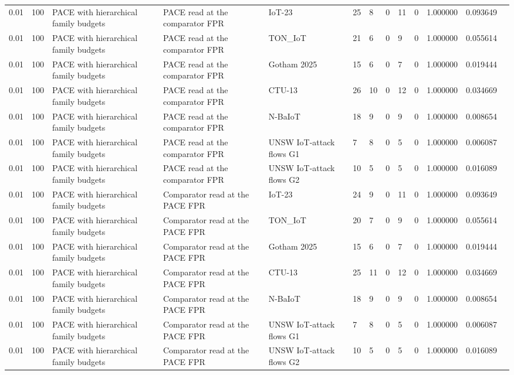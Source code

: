 \begin{tabular}{lllllllllllll}
0.01 & 100 & PACE with hierarchical family budgets & PACE read at the comparator FPR & IoT-23 & 25 & 8 & 0 & 11 & 0 & 1.000000 & 0.093649 &  \\
0.01 & 100 & PACE with hierarchical family budgets & PACE read at the comparator FPR & TON\_IoT & 21 & 6 & 0 & 9 & 0 & 1.000000 & 0.055614 &  \\
0.01 & 100 & PACE with hierarchical family budgets & PACE read at the comparator FPR & Gotham 2025 & 15 & 6 & 0 & 7 & 0 & 1.000000 & 0.019444 &  \\
0.01 & 100 & PACE with hierarchical family budgets & PACE read at the comparator FPR & CTU-13 & 26 & 10 & 0 & 12 & 0 & 1.000000 & 0.034669 &  \\
0.01 & 100 & PACE with hierarchical family budgets & PACE read at the comparator FPR & N-BaIoT & 18 & 9 & 0 & 9 & 0 & 1.000000 & 0.008654 &  \\
0.01 & 100 & PACE with hierarchical family budgets & PACE read at the comparator FPR & UNSW IoT-attack flows G1 & 7 & 8 & 0 & 5 & 0 & 1.000000 & 0.006087 &  \\
0.01 & 100 & PACE with hierarchical family budgets & PACE read at the comparator FPR & UNSW IoT-attack flows G2 & 10 & 5 & 0 & 5 & 0 & 1.000000 & 0.016089 &  \\
0.01 & 100 & PACE with hierarchical family budgets & Comparator read at the PACE FPR & IoT-23 & 24 & 9 & 0 & 11 & 0 & 1.000000 & 0.093649 &  \\
0.01 & 100 & PACE with hierarchical family budgets & Comparator read at the PACE FPR & TON\_IoT & 20 & 7 & 0 & 9 & 0 & 1.000000 & 0.055614 &  \\
0.01 & 100 & PACE with hierarchical family budgets & Comparator read at the PACE FPR & Gotham 2025 & 15 & 6 & 0 & 7 & 0 & 1.000000 & 0.019444 &  \\
0.01 & 100 & PACE with hierarchical family budgets & Comparator read at the PACE FPR & CTU-13 & 25 & 11 & 0 & 12 & 0 & 1.000000 & 0.034669 &  \\
0.01 & 100 & PACE with hierarchical family budgets & Comparator read at the PACE FPR & N-BaIoT & 18 & 9 & 0 & 9 & 0 & 1.000000 & 0.008654 &  \\
0.01 & 100 & PACE with hierarchical family budgets & Comparator read at the PACE FPR & UNSW IoT-attack flows G1 & 7 & 8 & 0 & 5 & 0 & 1.000000 & 0.006087 &  \\
0.01 & 100 & PACE with hierarchical family budgets & Comparator read at the PACE FPR & UNSW IoT-attack flows G2 & 10 & 5 & 0 & 5 & 0 & 1.000000 & 0.016089 &  \\

\end{tabular}
